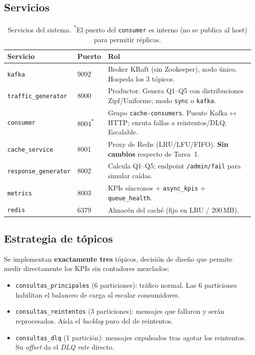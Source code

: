 \documentclass[11pt,a4paper]{article}
\begin{document}
\subsection{Servicios}
\begin{table}[H]
\centering
\small
\begin{tabular}{@{}llp{8.6cm}@{}}
\toprule
\textbf{Servicio} & \textbf{Puerto} & \textbf{Rol} \\
\midrule
\texttt{kafka} & 9092 & Broker KRaft (sin Zookeeper), nodo único. Hospeda los 3 tópicos. \\
\texttt{traffic\_generator} & 8000 & Productor. Genera Q1--Q5 con distribuciones Zipf/Uniforme; modo \texttt{sync} o \texttt{kafka}. \\
\texttt{consumer} & 8004\textsuperscript{*} & Grupo \texttt{cache-consumers}. Puente Kafka$\leftrightarrow$HTTP; enruta fallas a reintentos/DLQ. Escalable. \\
\texttt{cache\_service} & 8001 & Proxy de Redis (LRU/LFU/FIFO). \textbf{Sin cambios} respecto de Tarea~1. \\
\texttt{response\_generator} & 8002 & Calcula Q1--Q5; endpoint \texttt{/admin/fail} para simular caídas. \\
\texttt{metrics} & 8003 & KPIs síncronos + \texttt{async\_kpis} + \texttt{queue\_health}. \\
\texttt{redis} & 6379 & Almacén del caché (fijo en LRU / 200\,MB). \\
\bottomrule
\end{tabular}
\caption{Servicios del sistema. \textsuperscript{*}El puerto del \texttt{consumer} es interno (no se publica al host) para permitir réplicas.}
\end{table}

\subsection{Estrategia de tópicos}
Se implementan \textbf{exactamente tres} tópicos, decisión de diseño que
permite medir directamente los KPIs sin contadores mezclados:
\begin{itemize}[noitemsep]
  \item \texttt{consultas\_principales} (6 particiones): tráfico normal. Las
        6 particiones habilitan el balanceo de carga al escalar consumidores.
  \item \texttt{consultas\_reintentos} (3 particiones): mensajes que fallaron y
        serán reprocesados. Aísla el \emph{backlog} puro del de reintentos.
  \item \texttt{consultas\_dlq} (1 partición): mensajes expulsados tras agotar
        los reintentos. Su \emph{offset} da el \emph{DLQ rate} directo.
\end{itemize}
\end{document}
